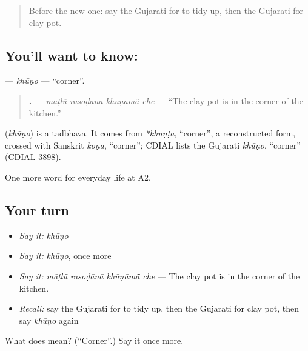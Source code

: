 \label{lesson:GU-C162-khuno}



\begin{quote}
Before the new one: say the Gujarati for to tidy up, then the Gujarati for clay pot.
\end{quote}

\subsection*{You'll want to know: }
\textbf{} — \emph{khūṇo} — \textquotedblleft{}corner\textquotedblright{}.

\begin{quote}
\textbf{   .} — \emph{māṭlũ rasoḍānā khūṇāmā̃ che} — \textquotedblleft{}The clay pot is in the corner of the kitchen.\textquotedblright{}
\end{quote}

\begin{cousinweb}
\textbf{} (\emph{khūṇo}) is a tadbhava. It comes from \emph{*khuṇṭa}, \textquotedblleft{}corner\textquotedblright{}, a reconstructed form, crossed with Sanskrit \emph{koṇa}, \textquotedblleft{}corner\textquotedblright{}; CDIAL lists the Gujarati \emph{khūṇo}, \textquotedblleft{}corner\textquotedblright{} (CDIAL 3898).
\end{cousinweb}

\begin{grammarlens}[title={What you've built}]
One more word for everyday life at A2.
\end{grammarlens}

\subsection*{Your turn}
\begin{itemize}
\raggedright
  \item \emph{Say it:} \emph{khūṇo}
  \item \emph{Say it:} \emph{khūṇo}, once more
  \item \emph{Say it:} \emph{māṭlũ rasoḍānā khūṇāmā̃ che} — The clay pot is in the corner of the kitchen.
  \item \emph{Recall:} say the Gujarati for to tidy up, then the Gujarati for clay pot, then say \emph{khūṇo} again
\end{itemize}

\begin{tcolorbox}[breakable,colback=teal!4,colframe=teal!35!black,title={Before you move on}]
What does  mean? (\textquotedblleft{}Corner\textquotedblright{}.) Say it once more.
\end{tcolorbox}

